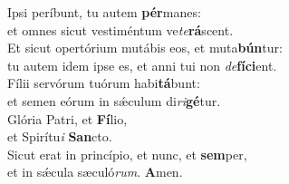 \oddverse Ipsi períbunt, tu autem \textbf{pér}manes:~\*\\
\oddverse et omnes sicut vestiméntum ve\textit{te}\textbf{rá}scent.\\
\evenverse Et sicut opertórium mutábis eos, et muta\textbf{bún}tur:~\*\\
\evenverse tu autem idem ipse es, et anni tui non \textit{de}\textbf{fí}\textbf{ci}ent.\\
\oddverse Fílii servórum tuórum habi\textbf{tá}bunt:~\*\\
\oddverse et semen eórum in sǽculum di\textit{ri}\textbf{gé}tur.\\
\evenverse Glória Patri, et \textbf{Fí}lio,~\*\\
\evenverse et Spirítu\textit{i} \textbf{San}cto.\\
\oddverse Sicut erat in princípio, et nunc, et \textbf{sem}per,~\*\\
\oddverse et in sǽcula sæculó\textit{rum}. \textbf{A}men.\\
